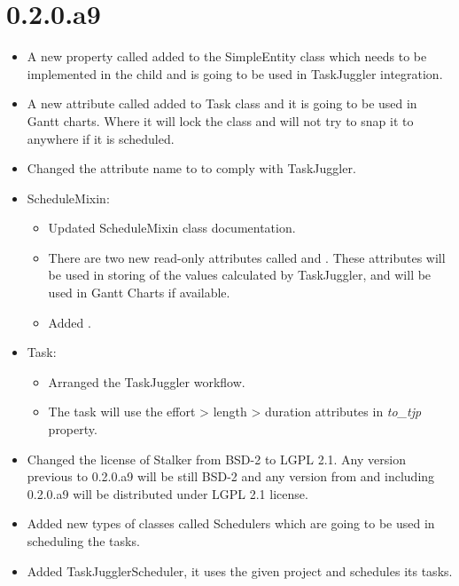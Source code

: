 \documentclass[a4paper,10pt,english]{sphinxmanual}
\begin{document}
\section{0.2.0.a9}
\label{changelog:a9}\begin{itemize}
\item {} 
A new property called  added to the SimpleEntity class which needs
to be implemented in the child and is going to be used in TaskJuggler
integration.

\item {} 
A new attribute called  added to Task class and it is going
to be used in Gantt charts. Where it will lock the class and will not try
to snap it to anywhere if it is scheduled.

\item {} 
Changed the  attribute name to  to comply
with TaskJuggler.

\item {} 
ScheduleMixin:
\begin{itemize}
\item {} 
Updated ScheduleMixin class documentation.

\item {} 
There are two new read-only attributes called  and
. These attributes will be used in storing of the values
calculated by TaskJuggler, and will be used in Gantt Charts if available.

\item {} 
Added .

\end{itemize}

\item {} 
Task:
\begin{itemize}
\item {} 
Arranged the TaskJuggler workflow.

\item {} 
The task will use the effort \textgreater{} length \textgreater{} duration attributes in \emph{to\_tjp}
property.

\end{itemize}

\item {} 
Changed the license of Stalker from BSD-2 to LGPL 2.1. Any version previous
to 0.2.0.a9 will be still BSD-2 and any version from and including 0.2.0.a9
will be distributed under LGPL 2.1 license.

\item {} 
Added new types of classes called Schedulers which are going to be used in
scheduling the tasks.

\item {} 
Added TaskJugglerScheduler, it uses the given project and schedules its
tasks.

\end{itemize}
\end{document}
